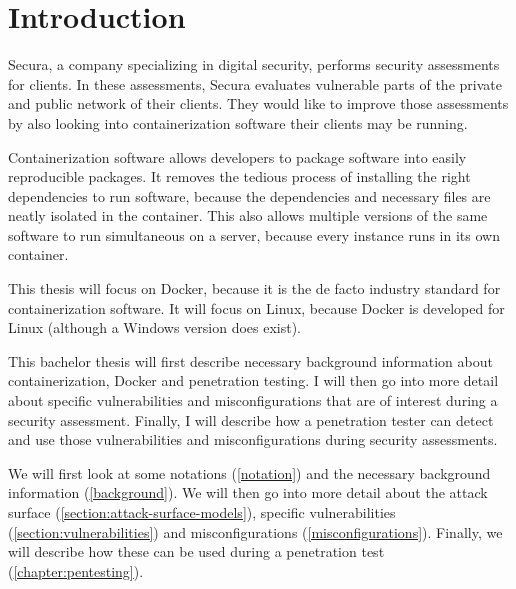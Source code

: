\chapter{Introduction}
Secura, a company specializing in digital security, performs security assessments for clients. In these assessments, Secura evaluates vulnerable parts of the private and public network of their clients. They would like to improve those assessments by also looking into containerization software their clients may be running.

\hfill

Containerization software allows developers to package software into easily reproducible packages.
It removes the tedious process of installing the right dependencies to run software, because the dependencies and necessary files are neatly isolated in the container. This also allows multiple versions of the same software to run simultaneous on a server, because every instance runs in its own container.

\hfill

This thesis will focus on Docker, because it is the de facto industry standard for containerization software. It will focus on Linux, because Docker is developed for Linux (although a Windows version does exist).

\hfill

This bachelor thesis will first describe necessary background information about containerization, Docker and penetration testing. I will then go into more detail about specific vulnerabilities and misconfigurations that are of interest during a security assessment. Finally, I will describe how a penetration tester can detect and use those vulnerabilities and misconfigurations during security assessments.

We will first look at some notations (\autoref{notation}) and the necessary background information (\autoref{background}). We will then go into more detail about the attack surface (\autoref{section:attack-surface-models}), specific vulnerabilities (\autoref{section:vulnerabilities}) and misconfigurations (\autoref{misconfigurations}). Finally, we will describe how these can be used during a penetration test (\autoref{chapter:pentesting}).
